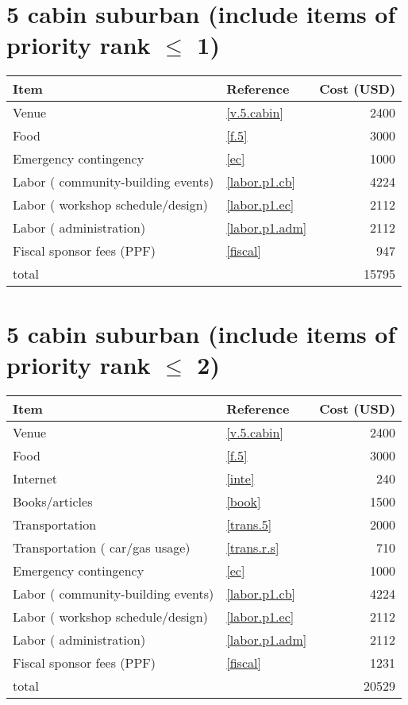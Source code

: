 \section*{5 cabin suburban (include items of priority rank $\leq$ 1)}
\begin{center}
\begin{tabular}{llr}
Item & Reference & Cost (USD) \\ \hline
Venue & \ref{v.5.cabin} & 2400 \\
Food & \ref{f.5} & 3000 \\
Emergency contingency & \ref{ec} & 1000 \\
Labor ( community-building events) & \ref{labor.p1.cb} & 4224 \\
Labor ( workshop schedule/design) & \ref{labor.p1.ec} & 2112 \\
Labor ( administration) & \ref{labor.p1.adm} & 2112 \\
Fiscal sponsor fees (PPF) & \ref{fiscal} & 947 \\ \hline
total &  & 15795
\end{tabular}
\end{center}
\newpage
\section*{5 cabin suburban (include items of priority rank $\leq$ 2)}
\begin{center}
\begin{tabular}{llr}
Item & Reference & Cost (USD) \\ \hline
Venue & \ref{v.5.cabin} & 2400 \\
Food & \ref{f.5} & 3000 \\
Internet & \ref{inte} & 240 \\
Books/articles & \ref{book} & 1500 \\
Transportation & \ref{trans.5} & 2000 \\
Transportation ( car/gas usage) & \ref{trans.r.s} & 710 \\
Emergency contingency & \ref{ec} & 1000 \\
Labor ( community-building events) & \ref{labor.p1.cb} & 4224 \\
Labor ( workshop schedule/design) & \ref{labor.p1.ec} & 2112 \\
Labor ( administration) & \ref{labor.p1.adm} & 2112 \\
Fiscal sponsor fees (PPF) & \ref{fiscal} & 1231 \\ \hline
total &  & 20529
\end{tabular}
\end{center}
\newpage
